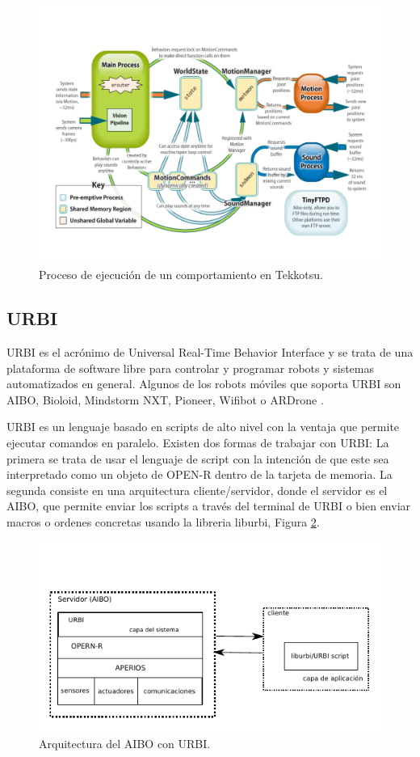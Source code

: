 \documentclass[12pt,a4paper,final,twoside]{book}
\begin{document}
 
\begin{figure}[h!]
	\centering
    \includegraphics[scale=0.3]{images/tekkotsuarch.pdf}
	 \caption{Proceso de ejecución de un comportamiento en Tekkotsu.}
  \label{fig:tekkarch}
\end{figure}

\subsection{URBI}
\label{urbi}
URBI es el acrónimo de Universal Real-Time Behavior Interface y se trata de una plataforma de software libre para controlar y programar robots y sistemas automatizados en general. Algunos de los robots móviles que soporta URBI son AIBO, Bioloid, Mindstorm NXT, Pioneer, Wifibot o ARDrone \cite{urbi}.

URBI es un lenguaje basado en scripts de alto nivel con la ventaja que permite ejecutar comandos en paralelo. Existen dos formas de trabajar con URBI: La primera  se trata de usar el lenguaje de script con la intención de que este sea interpretado como un objeto de OPEN-R dentro de la tarjeta de memoria. La segunda consiste en una arquitectura cliente/servidor, donde el servidor es el AIBO, que permite enviar los scripts a través del terminal de URBI o bien enviar macros o ordenes concretas usando la libreria liburbi, Figura \ref{fig:urbiarc}. 

\begin{figure}[h!]
	\centering
    \includegraphics[scale=1.4]{images/urbiarc.pdf}
	 \caption{Arquitectura del AIBO con URBI.}
  \label{fig:urbiarc}
\end{figure}
\end{document}
